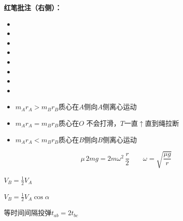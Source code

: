 \textbf{红笔批注（右侧）：}
\begin{itemize}
\item {}
\item {}
\item {}
\item {}
\item {}
\item {}
\item {}
\item {}
\end{itemize}
\begin{itemize}
\item $m_Ar_A>m_Br_B$\quad 质心在$A$侧\quad 向$A$侧离心运动
\item $m_Ar_A=m_Br_B$\quad 质心在$O$ 不会打滑，$T$一直$\uparrow$直到绳拉断
\item $m_Ar_A<m_Br_B$\quad 质心在$B$侧\quad 向$B$侧离心运动
\end{itemize}
\[
\mu\,2mg=2m\omega^2\,\frac{r}{2}
\qquad
\omega=\sqrt{\frac{\mu g}{r}}
\]
\begin{minipage}[t]{0.40\linewidth}
$V_B=\frac12V_A$
\end{minipage}\hfill
\begin{minipage}[t]{0.55\linewidth}
$V_B=\frac12V_A\cos\alpha$
\end{minipage}

\quad {}
\begin{minipage}[t]{0.47\linewidth}
\end{minipage}\hfill
\begin{minipage}[t]{0.50\linewidth}
等时间间隔投弹\quad $t_{ab}=2t_{bc}$
\end{minipage}

